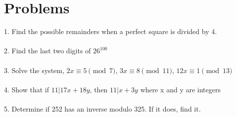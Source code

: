 \documentclass{article}
\begin{document}
\section{Problems}
1. Find the possible remainders when a perfect square is divided by 4.\\\\
2. Find the last two digits of $26^{100}$\\\\
3. Solve the system, $2x \equiv 5 \pmod{7}$, $3x \equiv 8 \pmod{11}$, $12x \equiv 1 \pmod{13}$\\\\
4. Show that if $11 | 17x+18y$, then $11 | x+3y$ where x and y are integers\\\\
5. Determine if 252 has an inverse modulo 325. If it does, find it.
\end{document}
